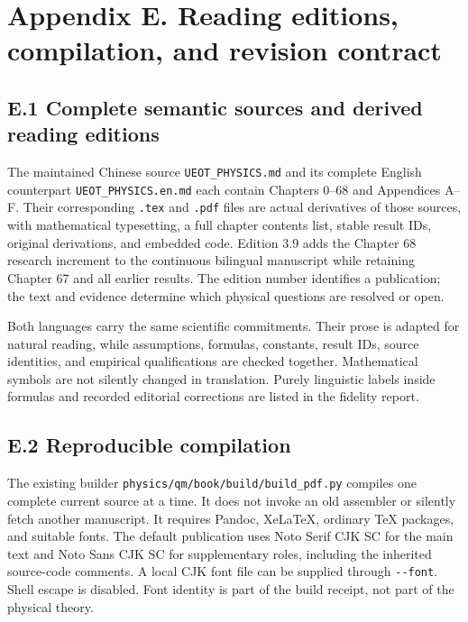 \documentclass[
  11pt,
  oneside]{book}
\begin{document}
\chapter{Appendix E. Reading editions, compilation, and revision
contract}\label{appendix-e}

\section{E.1 Complete semantic sources and derived reading editions}

The maintained Chinese source \texttt{UEOT\_\allowbreak PHYSICS.\allowbreak md} and its complete
English counterpart \texttt{UEOT\_\allowbreak PHYSICS.\allowbreak en.\allowbreak md} each contain Chapters
0--68 and Appendices A--F. Their corresponding \texttt{.\allowbreak tex} and
\texttt{.\allowbreak pdf} files are actual derivatives of those sources, with
mathematical typesetting, a full chapter contents list, stable result
IDs, original derivations, and embedded code. Edition 3.9 adds the
Chapter 68 research increment to the continuous bilingual manuscript
while retaining Chapter 67 and all earlier results. The edition number
identifies a publication; the text and evidence determine which physical
questions are resolved or open.

Both languages carry the same scientific commitments. Their prose is
adapted for natural reading, while assumptions, formulas, constants,
result IDs, source identities, and empirical qualifications are checked
together. Mathematical symbols are not silently changed in translation.
Purely linguistic labels inside formulas and recorded editorial
corrections are listed in the fidelity report.

\section{E.2 Reproducible compilation}

The existing builder \texttt{physics/\allowbreak qm/\allowbreak book/\allowbreak build/\allowbreak build\_\allowbreak pdf.\allowbreak py}
compiles one complete current source at a time. It does not invoke an
old assembler or silently fetch another manuscript. It requires Pandoc,
XeLaTeX, ordinary TeX packages, and suitable fonts. The default
publication uses Noto Serif CJK SC for the main text and Noto Sans CJK
SC for supplementary roles, including the inherited source-code
comments. A local CJK font file can be supplied through
\texttt{-\allowbreak \/\allowbreak -\allowbreak font}. Shell escape is disabled. Font identity is part of
the build receipt, not part of the physical theory.
\end{document}
